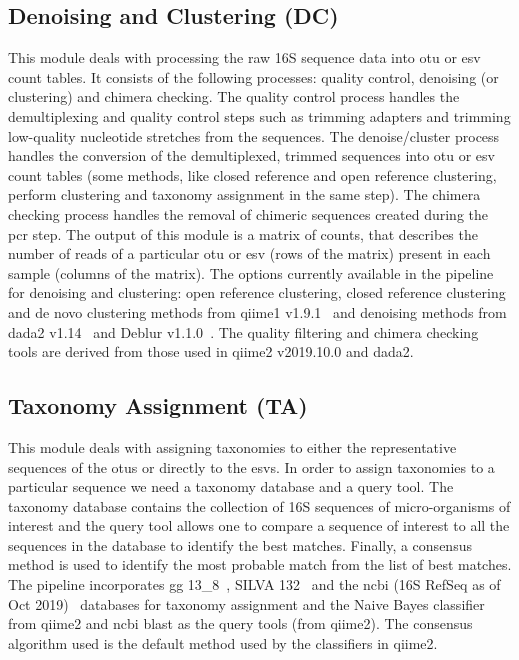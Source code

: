   \subsection*{Denoising and Clustering (DC)}
  \vspace{-5mm}
  This module deals with processing the raw 16S sequence data into \ac{otu} or \ac{esv} count tables.
  It consists of the following processes: quality control, denoising (or clustering) and chimera checking.
  The quality control process handles the demultiplexing and quality control steps such as trimming adapters and trimming low-quality nucleotide stretches from the sequences.
  The denoise/cluster process handles the conversion of the demultiplexed, trimmed sequences into \ac{otu} or \ac{esv} count tables (some methods, like closed reference and open reference clustering, perform clustering and taxonomy assignment in the same step).
  The chimera checking process handles the removal of chimeric sequences created during the \ac{pcr} step.
  The output of this module is a matrix of counts, that describes the number of reads of a particular \ac{otu} or \ac{esv} (rows of the matrix) present in each sample (columns of the matrix).
  The options currently available in the pipeline for denoising and clustering: open reference clustering, closed reference clustering and de novo clustering methods from \ac{qiime1} v1.9.1~\cite{Caporaso2010} and denoising methods from \ac{dada2} v1.14~\cite{Callahan2016} and Deblur v1.1.0~\cite{Amir2017}.
  The quality filtering and chimera checking tools are derived from those used in \ac{qiime2} v2019.10.0 and \ac{dada2}. 


  \subsection*{Taxonomy Assignment (TA)}
  \vspace{-5mm}
  This module deals with assigning taxonomies to either the representative sequences of the \ac{otu}s or directly to the \ac{esv}s.
  In order to assign taxonomies to a particular sequence we need a taxonomy database and a query tool.
  The taxonomy database contains the collection of 16S sequences of micro-organisms of interest and the query tool allows one to compare a sequence of interest to all the sequences in the database to identify the best matches.
  Finally, a consensus method is used to identify the most probable match from the list of best matches.
  The pipeline incorporates \ac{gg} 13\_8~\cite{DeSantis2006}, SILVA 132~\cite{Quast2012} and the \ac{ncbi} (16S RefSeq as of Oct 2019)~\cite{Sayers2009} databases for taxonomy assignment and the Naive Bayes classifier from \ac{qiime2} and \ac{ncbi} blast as the query tools (from \ac{qiime2}).
  The consensus algorithm used is the default method used by the classifiers in \ac{qiime2}.


